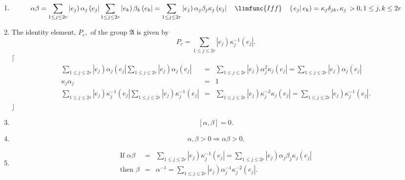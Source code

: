 \documentclass[aps,preprint]{revtex4}
\begin{document}
\begin{enumerate}
\item 
\begin{equation}
\alpha \beta =\sum_{1\leq j\leq 2r}\left\vert e_{j}\right) \alpha _{j}\left(
e_{j}\right\vert \sum_{1\leq j\leq 2r}\left\vert e_{k}\right) \beta
_{k}\left( e_{k}\right\vert =\sum_{1\leq j\leq 2r}\left\vert e_{j}\right)
\alpha _{j}\beta _{j}\kappa _{j}\left( e_{j}\right\vert \quad \limfunc{Iff}%
\quad \left( \left. e_{j}\right\vert e_{k}\right) =\kappa _{j}\delta
_{jk},\kappa _{j}\,>0,1\leq j,k\leq 2r
\end{equation}

\item The identity element, $P_{e},$ of the group $\mathfrak{A}$ is given by 
\begin{equation}
P_{e}=\sum_{1\leq j\leq 2r}\left\vert e_{j}\right) \kappa _{j}^{-1}\left(
e_{j}\right\vert .
\end{equation}%
$\lceil $%
\begin{eqnarray}
\sum_{1\leq j\leq 2r}\left\vert e_{j}\right) \alpha _{j}\left(
e_{j}\right\vert \sum_{1\leq j\leq 2r}\left\vert e_{j}\right) \alpha
_{j}\left( e_{j}\right\vert &=&\sum_{1\leq j\leq 2r}\left\vert e_{j}\right)
\alpha _{j}^{2}\kappa _{j}\left( e_{j}\right\vert =\sum_{1\leq j\leq
2r}\left\vert e_{j}\right) \alpha _{j}\left( e_{j}\right\vert \\
\kappa _{j}\alpha _{j} &=&1 \\
\sum_{1\leq j\leq 2r}\left\vert e_{j}\right) \kappa _{j}^{-1}\left(
e_{j}\right\vert \sum_{1\leq j\leq 2r}\left\vert e_{j}\right) \kappa
_{j}^{-1}\left( e_{j}\right\vert &=&\sum_{1\leq j\leq 2r}\left\vert
e_{j}\right) \kappa _{j}^{-2}\kappa _{j}\left( e_{j}\right\vert =\sum_{1\leq
j\leq 2r}\left\vert e_{j}\right) \kappa _{j}^{-1}\left( e_{j}\right\vert .
\end{eqnarray}%
$\rfloor $

\item 
\begin{equation}
\left[ \alpha ,\beta \right] =0.
\end{equation}

\item 
\begin{equation}
\alpha ,\beta >0\Rightarrow \alpha \beta >0.
\end{equation}

\item 
\begin{eqnarray}
\text{If }\alpha \beta &=&\sum_{1\leq j\leq 2r}\left\vert e_{j}\right)
\kappa _{j}^{-1}\left( e_{j}\right\vert =\sum_{1\leq j\leq 2r}\left\vert
e_{j}\right) \alpha _{j}\beta _{j}\kappa _{j}\left( e_{j}\right\vert \\
\text{then }\beta &=&\alpha ^{-1}=\sum_{1\leq j\leq 2r}\left\vert
e_{j}\right) \alpha _{j}^{-1}\kappa _{j}^{-2}\left( e_{j}\right\vert .
\end{eqnarray}


\end{enumerate}
\end{document}
